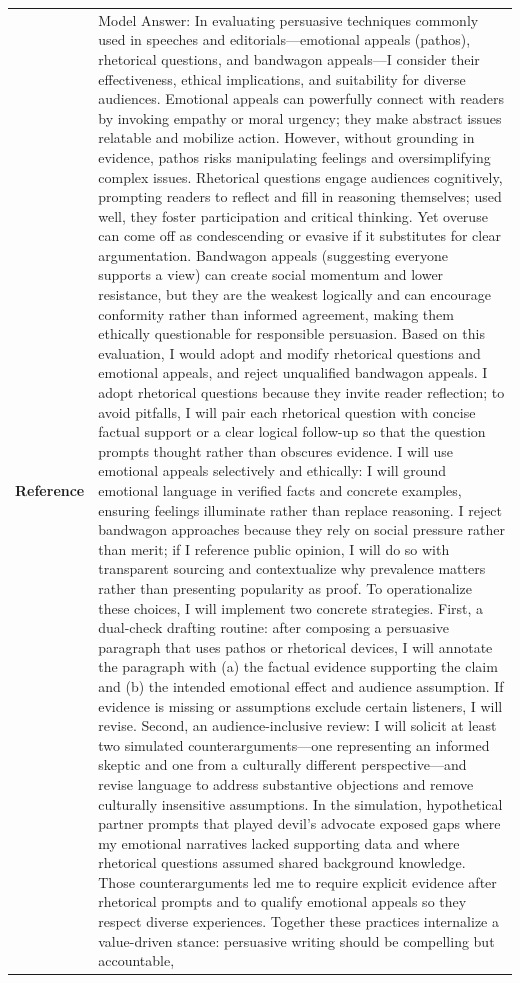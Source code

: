 \begin{longtable}{@{}l p{13cm}@{}}
  \textbf{Reference} & Model Answer: \newline In evaluating persuasive techniques commonly used in speeches and editorials---emotional appeals (pathos), rhetorical questions, and bandwagon appeals---I consider their effectiveness, ethical implications, and suitability for diverse audiences. Emotional appeals can powerfully connect with readers by invoking empathy or moral urgency; they make abstract issues relatable and mobilize action. However, without grounding in evidence, pathos risks manipulating feelings and oversimplifying complex issues. Rhetorical questions engage audiences cognitively, prompting readers to reflect and fill in reasoning themselves; used well, they foster participation and critical thinking. Yet overuse can come off as condescending or evasive if it substitutes for clear argumentation. Bandwagon appeals (suggesting everyone supports a view) can create social momentum and lower resistance, but they are the weakest logically and can encourage conformity rather than informed agreement, making them ethically questionable for responsible persuasion. \newline Based on this evaluation, I would adopt and modify rhetorical questions and emotional appeals, and reject unqualified bandwagon appeals. I adopt rhetorical questions because they invite reader reflection; to avoid pitfalls, I will pair each rhetorical question with concise factual support or a clear logical follow-up so that the question prompts thought rather than obscures evidence. I will use emotional appeals selectively and ethically: I will ground emotional language in verified facts and concrete examples, ensuring feelings illuminate rather than replace reasoning. I reject bandwagon approaches because they rely on social pressure rather than merit; if I reference public opinion, I will do so with transparent sourcing and contextualize why prevalence matters rather than presenting popularity as proof. \newline To operationalize these choices, I will implement two concrete strategies. First, a dual-check drafting routine: after composing a persuasive paragraph that uses pathos or rhetorical devices, I will annotate the paragraph with (a) the factual evidence supporting the claim and (b) the intended emotional effect and audience assumption. If evidence is missing or assumptions exclude certain listeners, I will revise. Second, an audience-inclusive review: I will solicit at least two simulated counterarguments---one representing an informed skeptic and one from a culturally different perspective---and revise language to address substantive objections and remove culturally insensitive assumptions. In the simulation, hypothetical partner prompts that played devil's advocate exposed gaps where my emotional narratives lacked supporting data and where rhetorical questions assumed shared background knowledge. Those counterarguments led me to require explicit evidence after rhetorical prompts and to qualify emotional appeals so they respect diverse experiences. \newline Together these practices internalize a value-driven stance: persuasive writing should be compelling but accountable, 
\end{longtable}
